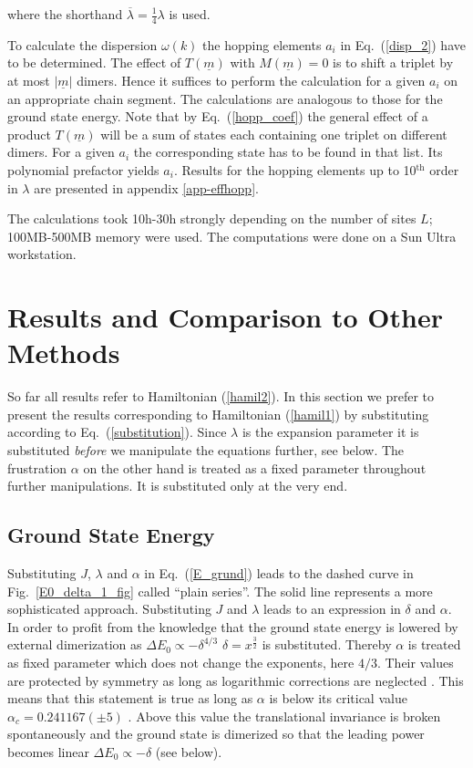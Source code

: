 where the shorthand $\overline{\lambda} = \frac{1}{4}\lambda$ is used.

To calculate the dispersion $\omega(k)$  the hopping
 elements $a_i$ in Eq.~(\ref{disp_2}) have to be determined. 
The effect of $T(\underline{m})$ with
 $M(\underline{m})=0$ is to shift a triplet by at most $|\underline{m}|$
 dimers. Hence it suffices to perform the calculation for a given $a_i$ on an 
appropriate chain segment. The calculations are analogous to those
 for the ground state energy. Note that by Eq.~(\ref{hopp_coef})
 the general effect of a product $T(\underline{m})$ will be a sum of
 states each containing one triplet on different dimers. For a given $a_i$
 the corresponding state has to be found in that list. Its
polynomial prefactor yields $a_i$. Results for
 the hopping elements up to 10$^{\mbox{th}}$ order in $\lambda$
 are presented in appendix \ref{app-effhopp}. 

The calculations took 10h-30h strongly depending on the number of
 sites $L$; 100MB-500MB memory were used. The computations were done on a Sun
 Ultra workstation.



\section{Results and Comparison to Other Methods}
So far all results refer to Hamiltonian (\ref{hamil2}). In this section we 
prefer to present the results corresponding to Hamiltonian (\ref{hamil1}) by
 substituting according to Eq.~(\ref{substitution}). Since 
$\lambda$ is the expansion parameter it is substituted {\em before} we 
manipulate the equations further, see below. The frustration $\alpha$ on the 
other hand is treated as a fixed parameter throughout further manipulations. It
 is substituted only at the very end. 
\subsection{Ground State Energy}
Substituting $J$, $\lambda$ and $\alpha$ in Eq.~(\ref{E_grund}) leads to the
 dashed curve in Fig.~\ref{E0_delta_1_fig} called ``plain series''. The solid
 line represents a more sophisticated approach. Substituting $J$ and $\lambda$
 leads to an expression in $\delta$ and $\alpha$. 
In order to profit from the knowledge that the ground state energy is lowered
by external dimerization as $\Delta E_0 \propto - \delta^{4/3}$ \cite{cross79}
$\delta=x^{\frac{3}{2}}$ is substituted. Thereby $\alpha$ is treated as
fixed parameter which does not change the exponents, here $4/3$. 
Their values are protected by symmetry \cite{uhrig96b}
as long as logarithmic corrections are neglected \cite{black81,affle89}.
 This means that this
statement is true as long as $\alpha$ is below its critical
value $\alpha_c=0.241167(\pm 5)$ \cite{egger96}. Above this value
the translational invariance is broken spontaneously and the ground
state is dimerized so that the leading power becomes linear
$\Delta E_0 \propto - \delta$ (see below).

